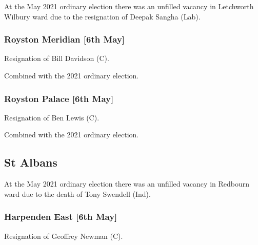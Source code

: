 \documentclass[a4paper,openany]{book}
\begin{document}
\begin{resultsiii}
At the May 2021 ordinary election there was an unfilled vacancy in Letchworth Wilbury ward due to the resignation of Deepak Sangha (Lab).

\subsubsection*{Royston Meridian \hspace*{\fill}\nolinebreak[1]%
	\enspace\hspace*{\fill}
	[6th May]}


Resignation of Bill Davidson (C).

Combined with the 2021 ordinary election.

\subsubsection*{Royston Palace \hspace*{\fill}\nolinebreak[1]%
	\enspace\hspace*{\fill}
	[6th May]}


Resignation of Ben Lewis (C).

Combined with the 2021 ordinary election.

\subsection*{St Albans}

At the May 2021 ordinary election there was an unfilled vacancy in Redbourn ward due to the death of Tony Swendell (Ind).

\subsubsection*{Harpenden East \hspace*{\fill}\nolinebreak[1]%
	\enspace\hspace*{\fill}
	[6th May]}


Resignation of Geoffrey Newman (C).


\end{resultsiii}
\end{document}
